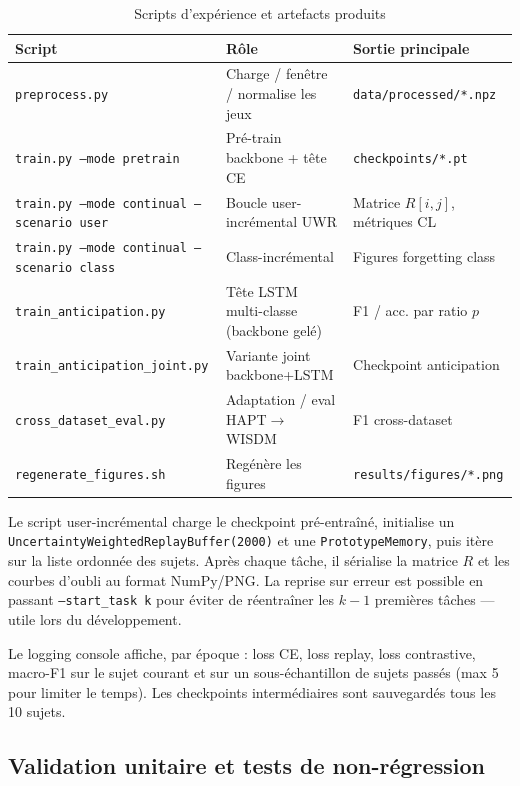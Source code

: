 \begin{table}[H]
\centering
\small
\begin{tabularx}{\textwidth}{|>{\raggedright\arraybackslash}p{4.5cm}|Y|>{\raggedright\arraybackslash}p{3.2cm}|}
\hline
\textbf{Script} & \textbf{Rôle} & \textbf{Sortie principale} \\
\hline
\texttt{preprocess.py} & Charge / fenêtre / normalise les jeux & \texttt{data/processed/*.npz} \\
\texttt{train.py --mode pretrain} & Pré-train backbone + tête CE & \texttt{checkpoints/*.pt} \\
\texttt{train.py --mode continual --scenario user} & Boucle user-incrémental UWR & Matrice $R[i,j]$, métriques CL \\
\texttt{train.py --mode continual --scenario class} & Class-incrémental & Figures forgetting class \\
\texttt{train\_anticipation.py} & Tête LSTM multi-classe (backbone gelé) & F1 / acc. par ratio $p$ \\
\texttt{train\_anticipation\_joint.py} & Variante joint backbone+LSTM & Checkpoint anticipation \\
\texttt{cross\_dataset\_eval.py} & Adaptation / eval HAPT$\rightarrow$WISDM & F1 cross-dataset \\
\texttt{regenerate\_figures.sh} & Regénère les figures & \texttt{results/figures/*.png} \\
\hline
\end{tabularx}
\caption{Scripts d'expérience et artefacts produits}
\label{tab:scripts_exp}
\end{table}

Le script user-incrémental charge le checkpoint pré-entraîné, initialise un
\texttt{UncertaintyWeightedReplayBuffer(2000)} et une \texttt{PrototypeMemory},
puis itère sur la liste ordonnée des sujets. Après chaque tâche, il sérialise
la matrice $R$ et les courbes d'oubli au format NumPy/PNG. La reprise sur
erreur est possible en passant \texttt{--start\_task k} pour éviter de
réentraîner les $k-1$ premières tâches — utile lors du développement.

Le logging console affiche, par époque : loss CE, loss replay, loss contrastive,
macro-F1 sur le sujet courant et sur un sous-échantillon de sujets passés (max
5 pour limiter le temps). Les checkpoints intermédiaires sont sauvegardés tous
les 10 sujets.

\subsection{Validation unitaire et tests de non-régression}

